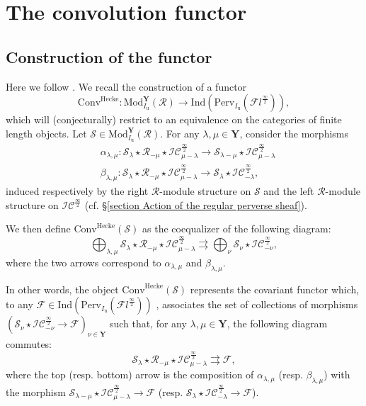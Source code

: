 \documentclass[11pt]{amsart}
\theoremstyle{plain}
\theoremstyle{remark}
\numberwithin{equation}{section}
\begin{document}
	\section{The convolution functor}\label{section equivalence}
	\subsection{Construction of the functor}\label{Construction of the functor and first properties}
	Here we follow \cite[§6.1.1]{ABBGM}. We recall the construction of a functor 
	$$\mathrm{Conv}^{\mathrm{Hecke}}:\mathrm{Mod}^\mathbf{Y}_{I_\mathrm{u}}(\mathcal{R})\to\mathrm{Ind}(\mathrm{Perv}_{{I_\mathrm{u}}}(\mathcal{F}l^{\frac{\infty}{2}})), $$
	which will (conjecturally) restrict to an equivalence on the categories of finite length objects. Let $\mathcal{S}\in \mathrm{Mod}^\mathbf{Y}_{I_\mathrm{u}}(\mathcal{R})$. For any $\lambda,\mu\in\mathbf{Y}$, consider the morphisms 
	\begin{align*}
	    &\alpha_{\lambda,\mu}:\mathcal{S}_\lambda\star\mathcal{R}_{-\mu}\star\mathcal{IC}^{\frac{\infty}{2}}_{\mu-\lambda}\to  \mathcal{S}_{\lambda-\mu}\star\mathcal{IC}^{\frac{\infty}{2}}_{\mu-\lambda}\\
     &\beta_{\lambda,\mu}:\mathcal{S}_\lambda\star\mathcal{R}_{-\mu}\star\mathcal{IC}^{\frac{\infty}{2}}_{\mu-\lambda}\to  \mathcal{S}_{\lambda}\star\mathcal{IC}^{\frac{\infty}{2}}_{-\lambda},
	\end{align*}
	induced respectively by the right $\mathcal{R}$-module structure on $\mathcal{S}$ and the left $\mathcal{R}$-module structure on $\mathcal{IC}^{\frac{\infty}{2}}$ (cf. §\ref{section Action of the regular perverse sheaf}). 
 
 We then define $\mathrm{Conv}^{\mathrm{Hecke}}(\mathcal{S})$ as the coequalizer of the following diagram:
	$$  \bigoplus_{\lambda,\mu}\mathcal{S}_\lambda\star\mathcal{R}_{-\mu}\star\mathcal{IC}^{\frac{\infty}{2}}_{\mu-\lambda}\rightrightarrows\bigoplus_\nu \mathcal{S}_{\nu}\star\mathcal{IC}^{\frac{\infty}{2}}_{-\nu},$$
	where the two arrows correspond to $\alpha_{\lambda,\mu}$ and $\beta_{\lambda,\mu}$. 
	
	In other words, the object $\mathrm{Conv}^{\mathrm{Hecke}}(\mathcal{S})$ represents the covariant functor which, to any $\mathcal{F}\in \mathrm{Ind}(\mathrm{Perv}_{{I_\mathrm{u}}}(\mathcal{F}l^{\frac{\infty}{2}}))$ , associates the set of collections of morphisms $(\mathcal{S}_{\nu}\star\mathcal{IC}^{\frac{\infty}{2}}_{-\nu}\to \mathcal{F})_{\nu\in\mathbf{Y}}$ such that, for any $\lambda,\mu\in\mathbf{Y}$, the following diagram commutes:
	\begin{equation}\label{diagram coeq}
		\mathcal{S}_\lambda\star\mathcal{R}_{-\mu}\star\mathcal{IC}^{\frac{\infty}{2}}_{\mu-\lambda}\rightrightarrows\mathcal{F}, 
	\end{equation}
	where the top (resp. bottom) arrow is the composition of $\alpha_{\lambda,\mu}$ (resp. $\beta_{\lambda,\mu}$) with the morphism $ \mathcal{S}_{\lambda-\mu}\star\mathcal{IC}^{\frac{\infty}{2}}_{\mu-\lambda}\to \mathcal{F}$ (resp. $ \mathcal{S}_{\lambda}\star\mathcal{IC}^{\frac{\infty}{2}}_{-\lambda}\to \mathcal{F}$).
\end{document}
